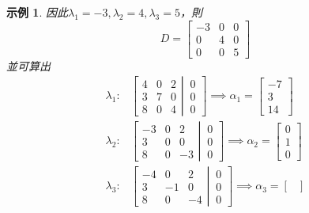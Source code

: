 \documentclass[12pt]{article}
\newtheorem*{example}{示例}
\begin{document}
\begin{example}
        因此$\lambda_1=-3, \lambda_2=4, \lambda_3=5$，則$$D=\begin{bmatrix}
            -3&0&0\\0&4&0\\0&0&5
        \end{bmatrix}$$
        並可算出\begin{align*}
            \lambda_1:&\left[\begin{matrix}
                4&0&2\\3&7&0\\8&0&4
            \end{matrix}\left|
            \, 
            \begin{matrix}
                0\\0\\0
            \end{matrix}\right.\right]\implies \alpha_1=\begin{bmatrix}
                -7\\3\\14
            \end{bmatrix}\\
            \lambda_2:&\left[\begin{matrix}
                -3&0&2\\3&0&0\\8&0&-3
            \end{matrix}\left|
            \, 
            \begin{matrix}
                0\\0\\0
            \end{matrix}\right.\right]\implies \alpha_2=\begin{bmatrix}
                0\\1\\0
            \end{bmatrix}\\
            \lambda_3:&\left[\begin{matrix}
                -4&0&2\\3&-1&0\\8&0&-4
            \end{matrix}\left|
            \, 
            \begin{matrix}
                0\\0\\0
            \end{matrix}\right.\right]\implies \alpha_3=\begin{bmatrix}

\end{bmatrix}
\end{align*}
\end{example}
\end{document}
